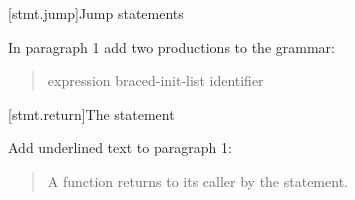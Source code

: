 %
%
%
%
%
%
%

\setcounter{section}{5}
[stmt.jump]{Jump statements}%

In paragraph 1 add two productions to the grammar:

\begin{quote}
  \begin{bnf}
    \br
    \br
    \br
     expression\opt \terminal{;}\br
     braced-init-list \terminal{;}\br
     \br
     identifier \terminal{;}
  \end{bnf}
\end{quote}

\setcounter{subsection}{2}
[stmt.return]{The  statement}%
%
%

Add underlined text to paragraph 1:

\begin{quote}
\pnum
A function returns to its caller by the  statement.
\end{quote}

